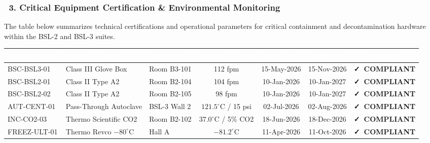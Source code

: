 \documentclass[10pt,a4paper]{scrartcl}
\newcommand{\statuspass}{\colorbox{TealLight}{\textcolor{AlertGreen}{\scriptsize\bfseries\:\faCheck\ COMPLIANT\:}}}
\begin{document}
\pagebreak

\subsubsection*{\textcolor{NavyPrimary}{\faTools\ 3. Critical Equipment Certification \& Environmental Monitoring}}

{\small The table below summarizes technical certifications and operational parameters for critical containment and decontamination hardware within the BSL-2 and BSL-3 suites.}

\vspace{4pt}

\begin{tcolorbox}[auditcard, left=0pt, right=0pt, top=0pt, bottom=0pt]
\small
{}
\begin{tabularx}{\textwidth}{l X X c c c c}
\rowcolor{TableHeadBg}
\textcolor{white}{\textbf{Equipment ID}} & \textcolor{white}{\textbf{Model / Type}} & \textcolor{white}{\textbf{Location}} & \textcolor{white}{\textbf{Airflow / Temp}} & \textcolor{white}{\textbf{Last Cert}} & \textcolor{white}{\textbf{Next Due}} & \textcolor{white}{\textbf{Status}} \\
\midrule
BSC-BSL3-01 & Class III Glove Box & Room B3-101 & 112 fpm & 15-May-2026 & 15-Nov-2026 & \statuspass \\
BSC-BSL2-01 & Class II Type A2 & Room B2-104 & 104 fpm & 10-Jan-2026 & 10-Jan-2027 & \statuspass \\
BSC-BSL2-02 & Class II Type A2 & Room B2-105 & 98 fpm & 10-Jan-2026 & 10-Jan-2027 & \statuspass \\
AUT-CENT-01 & Pass-Through Autoclave & BSL-3 Wall 2 & $121.5^{\circ}\text{C}$ / 15 psi & 02-Jul-2026 & 02-Aug-2026 & \statuspass \\
INC-CO2-03 & Thermo Scientific CO2 & Room B2-102 & $37.0^{\circ}\text{C}$ / 5\% CO2 & 18-Jun-2026 & 18-Dec-2026 & \statuspass \\
FREEZ-ULT-01 & Thermo Revco $-80^{\circ}\text{C}$ & Hall A & $-81.2^{\circ}\text{C}$ & 11-Apr-2026 & 11-Oct-2026 & \statuspass \\
\bottomrule
\end{tabularx}
\end{tcolorbox}

\vspace{6pt}
\end{document}
